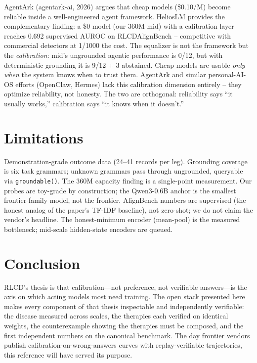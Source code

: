 \documentclass[11pt]{article}
\begin{document}
AgentArk (agentark-ai, 2026) argues that cheap models (\$0.10/M) become
reliable inside a well-engineered agent framework. HeliosLM provides
the complementary finding: a \$0 model (our 360M mid) with a
calibration layer reaches 0.692 supervised AUROC on RLCDAlignBench --
competitive with commercial detectors at 1/1000 the cost. The
equalizer is not the framework but the \emph{calibration}: mid's
ungrounded agentic performance is 0/12, but with deterministic
grounding it is 9/12 + 3 abstained. Cheap models are usable \emph{only
when} the system knows when to trust them. AgentArk and similar
personal-AI-OS efforts (OpenClaw, Hermes) lack this calibration
dimension entirely -- they optimize reliability, not honesty. The
two are orthogonal: reliability says ``it usually works,''
calibration says ``it knows when it doesn't.''

\section{Limitations}

Demonstration-grade outcome data (24--41 records per leg). Grounding
coverage is six task grammars; unknown grammars pass through
ungrounded, queryable via \texttt{groundable()}. The 360M capacity
finding is a single-point measurement. Our probes are toy-grade by
construction; the Qwen3-0.6B anchor is the smallest frontier-family
model, not the frontier. AlignBench numbers are supervised (the honest
analog of the paper's TF-IDF baseline), not zero-shot; we do not claim
the vendor's headline. The honest-minimum encoder (mean-pool) is the
measured bottleneck; mid-scale hidden-state encoders are queued.

\section{Conclusion}

RLCD's thesis is that calibration---not preference, not verifiable
answers---is the axis on which acting models most need training. The
open stack presented here makes every component of that thesis
inspectable and independently verifiable: the disease measured across
scales, the therapies each verified on identical weights, the
counterexample showing the therapies must be composed, and the first
independent numbers on the canonical benchmark. The day frontier vendors
publish calibration-on-wrong-answers curves with replay-verifiable
trajectories, this reference will have served its purpose.
\end{document}

